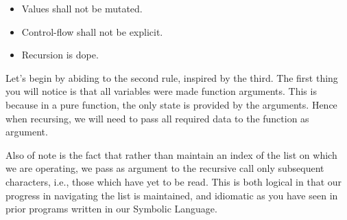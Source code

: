 \begin{itemize}
  \item Values shall not be mutated.
  \item Control-flow shall not be explicit.
  \item Recursion is dope.
\end{itemize}

Let's begin by abiding to the second rule, inspired by the third. The first thing 
you will notice is that all variables were made function arguments. This is because 
in a pure function, the only state is provided by the arguments. Hence when 
recursing, we will need to pass all required data to the function as argument.

Also of note is the fact that rather than maintain an index of the list on which we 
are operating, we pass as argument to the recursive call only subsequent characters, 
i.e., those which have yet to be read. This is both logical in that our progress in 
navigating the list is maintained, and idiomatic as you have seen in prior programs 
written in our Symbolic Language.

